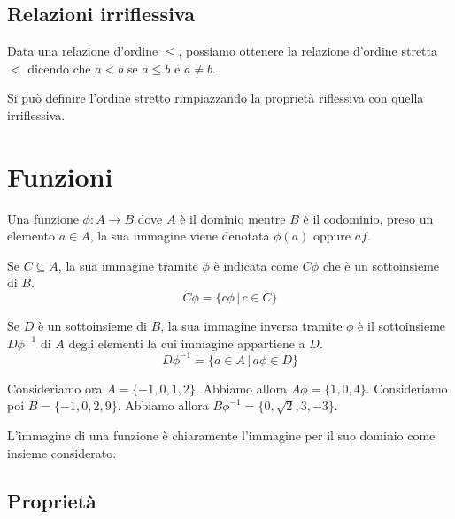 \documentclass[a4paper]{article}
\begin{document}
\subsection{Relazioni irriflessiva}

Data una relazione d'ordine \(\leq\), possiamo ottenere la relazione d'ordine stretta \(<\)
dicendo che \(a<b \) se \(a\leq b\) e \(a\neq b\).

Si può definire l'ordine stretto rimpiazzando la proprietà riflessiva con quella irriflessiva.

\section{Funzioni}

Una funzione \(\phi\colon A \to B\) dove \(A\) è il dominio mentre \(B\) è il codominio,
preso un elemento \(a\in A\), la sua immagine viene denotata \(\phi(a)\) oppure \(af\).

Se \(C \subseteq A\), la sua immagine tramite \(\phi\) è indicata come \(C\phi\)
che è un sottoinsieme di \(B\).
\[
    C\phi = \{  c\phi \,|\, c\in C \}
\]

Se \(D\) è un sottoinsieme di \(B\), la sua immagine inversa tramite \(\phi\)
è il sottoinsieme \(D\phi^{-1}\) di \(A\) degli elementi la cui immagine appartiene a \(D\).
\[
    D\phi^{-1} = \{  a \in A \,|\, a\phi \in D \}
\]


Consideriamo ora \(A=\{-1,0,1,2\}\). Abbiamo allora \(A\phi = \{1,0,4\}\).
Consideriamo poi \(B=\{-1, 0, 2, 9\}\). Abbiamo allora \(B\phi^{-1} = \{0, \sqrt{2}, 3, -3\}\).

L'immagine di una funzione è chiaramente l'immagine per il suo dominio come insieme considerato.

\subsection{Proprietà}


\end{document}
